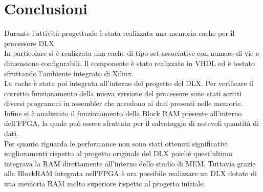 \clearpage{\pagestyle{empty}\cleardoublepage}
\chapter*{Conclusioni}


Durante l'attivit\`a progettuale \`e stata realizzata una memoria cache per il processore DLX.\\
In particolare si \`e realizzata una cache di tipo set-associative con numero di vie e dimensione configurabili. Il componente \`e stato realizzato in VHDL ed \`e testato sfruttando l'ambiente integrato di Xilinx.\\

La cache \`e stata poi integrata all'interno del progetto del DLX. Per verificare il corretto funzionamento della nuova versione del processore sono stati scritti diversi programmi in assembler che accedono ai dati presenti nelle memorie.\\

Infine si \`e analizzato il funzionamento della Block RAM presente all'interno dell'FPGA, la quale pu\`o essere sfruttata per il salvataggio di notevoli quantit\`a di dati.\\

Per quanto riguarda le performance non sono stati ottenuti significativi miglioramenti rispetto al progetto originale del DLX poich\'e quest'ultimo integrava la RAM direttamente all'interno dello stadio di MEM. Tuttavia grazie alla BlockRAM integrata nell'FPGA \`e ora possibile realizzare un DLX dotato di una memoria RAM molto superiore rispetto al progetto iniziale.